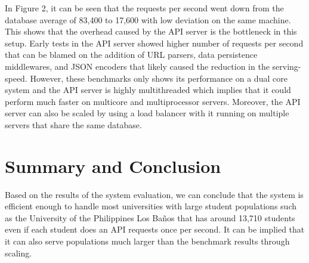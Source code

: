\documentclass{sigchi}
\begin{document}
In Figure 2, it can be seen that the requests per second went down
from the database average of 83,400 to 17,600 with low deviation on the same machine.
This shows that the overhead caused by the API server is the bottleneck in this setup. 
Early tests in the API server showed higher number of requests per second
that can be blamed on the addition of URL parsers, data persistence middlewares, and JSON encoders
that likely caused the reduction in the serving-speed. However, these benchmarks only shows its performance
on a dual core system and the API server is highly multithreaded which implies that it could perform much faster
on multicore and multiprocessor servers. Moreover, the API server can also be scaled by using a load balancer
with it running on multiple servers that share the same database. 

\section{Summary and Conclusion}

Based on the results of the system evaluation, we can conclude that the system is efficient enough to handle most 
universities with large student 
populations such as the University of the Philippines Los Baños that has around 13,710 students even if each student
does an API requests once per second. It can be implied that it can also serve populations much larger than the benchmark
results through scaling. 



\end{document}
